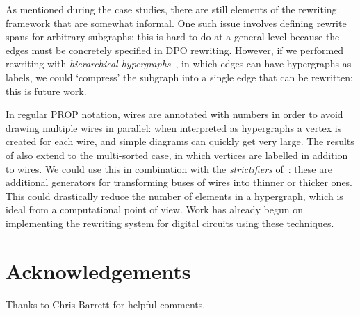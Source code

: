 As mentioned during the case studies, there are still elements of the rewriting
framework that are somewhat informal.
One such issue involves defining rewrite spans for arbitrary subgraphs: this is
hard to do at a general level because the edges must be concretely specified in
DPO rewriting.
However, if we performed rewriting with
\emph{hierarchical hypergraphs}~\cite{alvarez-picallo2021functorial}, in
which edges can have hypergraphs as labels, we could `compress' the subgraph
into a single edge that can be rewritten: this is future work.

In regular PROP notation, wires are annotated with numbers in order to avoid
drawing multiple wires in parallel: when interpreted as hypergraphs a vertex is
created for each wire, and simple diagrams can quickly get very large.
The results of \cite{bonchi2022stringa} also extend to the multi-sorted case, in
which vertices are labelled in addition to wires.
We could use this in combination with the \emph{strictifiers}
of~\cite{wilson2022string}: these are additional generators for transforming
buses of wires into thinner or thicker ones.
This could drastically reduce the number of elements in a hypergraph, which is
ideal from a computational point of view.
Work has already begun on implementing the rewriting system for digital circuits
using these techniques.

\section*{Acknowledgements}

Thanks to Chris Barrett for helpful comments.